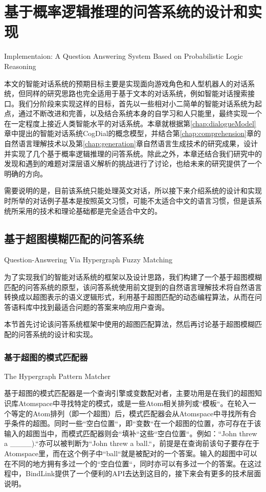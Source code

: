 \chapter{基于概率逻辑推理的问答系统的设计和实现}{Implementaion: A Question Answering System Based on Probabilistic Logic Reasoning}
\label{chap:dialogue}


本文的智能对话系统的预期目标主要是实现面向游戏角色和人型机器人的对话系统，但同样的研究思路也完全适用于基于文本的对话系统，例如智能对话搜索接口。我们分阶段来实现这样的目标，首先以一些相对小二简单的智能对话系统为起点，通过不断改进和完善，以及结合系统本身的自学习和人只能里，最终实现一个在一定程度上接近人类智能水平的对话系统。本章就根据第\ref{chap:dialogueModel}章中提出的智能对话系统CogDial的概念模型，并结合第\ref{chap:comprehension}章的自然语言理解技术以及第\ref{chap:generation}章自然语言生成技术的研究成果，设计并实现了几个基于概率逻辑推理的问答系统。除此之外，本章还结合我们研究中的发现和遇到的难题对深层语义解析的挑战进行了讨论，也给未来的研究提供了一个明确的方向。

需要说明的是，目前该系统只能处理英文对话，所以接下来介绍系统的设计和实现时所举的对话例子基本是按照英文习惯，可能不太适合中文的语言习惯，但是该系统所采用的技术和理论基础都是完全适合中文的。


\section{基于超图模糊匹配的问答系统}{Question-Answering Via Hypergraph Fuzzy Matching}

为了实现我们的智能对话系统的框架以及设计思路，我们构建了一个基于超图模糊匹配的问答系统的原型，该问答系统使用前文提到的自然语言理解技术将自然语言转换成以超图表示的语义逻辑形式，利用基于超图匹配的动态编程算法，从而在问答语料库中找到最适合问题的答案来响应用户查询。

本节首先讨论该问答系统框架中使用的超图匹配算法，然后再讨论基于超图模糊匹配的问答系统的设计和实现。

\subsection{基于超图的模式匹配器}{The Hypergraph Pattern Matcher}

基于超图的模式匹配器是一个查询引擎或变数配对者，主要功用是在我们的超图知识库Atomspace中寻找特定的模式，或是一些Atom相关排列或“模板“。在轮入一个等定的Atom排列（即一个超图）后，模式匹配器会从Atomspace中寻找所有合乎条件的超图。同时一些“空白位置“，即“变数“在一个超图的位置，亦可存在于该输入的超图当中，而模式匹配器则会“填补“这些“空白位置“。例如：“John threw a \_\_\_\_).“亦可以被判断为“John threw a ball.“，前提是在查询前该句子要存在于Atomspace里，而在这个例子中“ball“就是被配对的一个答案。输入的超图中可以在不同的地方拥有多过一个的“空白位置“，同时亦可以有多过一个的答案。在这过程中，BindLink提供了一个便利的API去达到这目的，接下来会有更多的技术层面说明。

